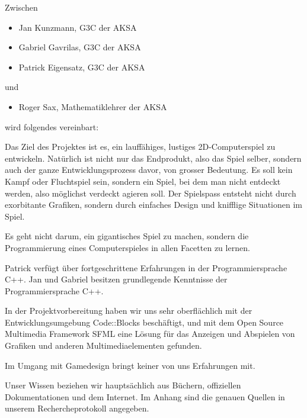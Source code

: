 \documentclass[parskip=half]{scrreprt}
\begin{document}
 
  

\begin{contract} 
Zwischen
\begin{itemize}
\item Jan Kunzmann, G3C der AKSA
\item Gabriel Gavrilas, G3C der AKSA
\item Patrick Eigensatz, G3C der AKSA
\end{itemize}
und
\begin{itemize}
\item Roger Sax, Mathematiklehrer der AKSA
\end{itemize}
wird folgendes vereinbart:



  
Das Ziel des Projektes ist es, ein lauffähiges, lustiges 2D-Computerspiel zu entwickeln. Natürlich
ist nicht nur das Endprodukt, also das Spiel selber, sondern auch der ganze
Entwicklungsprozess davor, von grosser Bedeutung. Es soll kein Kampf oder Fluchtspiel sein, sondern ein Spiel,
bei dem man nicht entdeckt werden, also möglichst verdeckt agieren soll. Der Spielspass entsteht nicht durch exorbitante Grafiken, sondern durch einfaches Design und knifflige Situationen im Spiel.

Es geht nicht darum, ein gigantisches Spiel zu machen, sondern die Programmierung eines Computerspieles in allen Facetten zu lernen.


Patrick verfügt über fortgeschrittene Erfahrungen in der Programmiersprache C++. Jan und Gabriel besitzen grundlegende Kenntnisse der Programmiersprache C++.

In der Projektvorbereitung haben wir uns sehr oberflächlich mit der Entwicklungsumgebung Code::Blocks beschäftigt, und mit dem Open Source Multimedia Framework SFML eine Lösung für das Anzeigen und Abspielen von Grafiken und anderen Multimediaelementen gefunden.

Im Umgang mit Gamedesign bringt keiner von uns Erfahrungen mit.

Unser Wissen beziehen wir hauptsächlich aus Büchern, offiziellen Dokumentationen und dem Internet. Im Anhang sind die genauen Quellen in unserem Rechercheprotokoll angegeben.



\end{contract}
\end{document}
